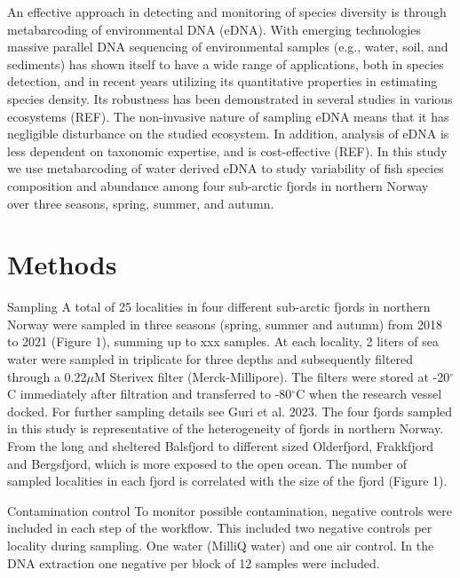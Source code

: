 \documentclass[12pt]{article}
\begin{document}
An effective approach in detecting and monitoring of species diversity is through metabarcoding of environmental DNA (eDNA). With emerging technologies massive parallel DNA sequencing of environmental samples (e.g., water, soil, and sediments) has shown itself to have a wide range of applications, both in species detection, and in recent years utilizing its quantitative properties in estimating species density. Its robustness has been demonstrated in several studies in various ecosystems (REF). The non-invasive nature of sampling eDNA means that it has negligible disturbance on the studied ecosystem. In addition, analysis of eDNA is less dependent on taxonomic expertise, and is cost-effective (REF).
In this study we use metabarcoding of water derived eDNA to study variability of fish species composition and abundance among four sub-arctic fjords in northern Norway over three seasons, spring, summer, and autumn. 

\cite{guri2024}

\section{Methods}
\label{sec:meth}
Sampling
A total of 25 localities in four different sub-arctic fjords in northern Norway were sampled in three seasons (spring, summer and autumn) from 2018 to 2021 (Figure 1), summing up to xxx samples. At each locality, 2 liters of sea water were sampled in triplicate for three depths and subsequently filtered through a 0.22$\mu$M Sterivex filter (Merck-Millipore). The filters were stored at -20$^\circ$C immediately after filtration and transferred to -80$^\circ$C when the research vessel docked. For further sampling details see Guri et al. 2023. The four fjords sampled in this study is representative of the heterogeneity of fjords in northern Norway. From the long and sheltered Balsfjord to different sized Olderfjord, Frakkfjord and Bergsfjord, which is more exposed to the open ocean. The number of sampled localities in each fjord is correlated with the size of the fjord (Figure 1).


Contamination control
To monitor possible contamination, negative controls were included in each step of the workflow. This included two negative controls per locality during sampling. One water (MilliQ water) and one air control. In the DNA extraction one negative per block of 12 samples were included.
\end{document}

